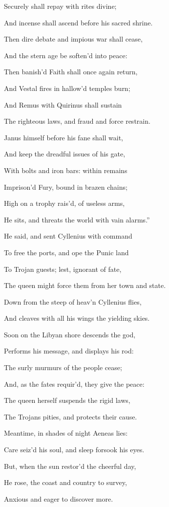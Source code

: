 Securely shall repay with rites divine;

And incense shall ascend before his sacred shrine.

Then dire debate and impious war shall cease,

And the stern age be soften’d into peace:

Then banish’d Faith shall once again return,

And Vestal fires in hallow’d temples burn;

And Remus with Quirinus shall sustain

The righteous laws, and fraud and force restrain.

Janus himself before his fane shall wait,

And keep the dreadful issues of his gate,

With bolts and iron bars: within remains

Imprison’d Fury, bound in brazen chains;

High on a trophy rais’d, of useless arms,

He sits, and threats the world with vain alarms.”

He said, and sent Cyllenius with command

To free the ports, and ope the Punic land

To Trojan guests; lest, ignorant of fate,

The queen might force them from her town and state.

Down from the steep of heav’n Cyllenius flies,

And cleaves with all his wings the yielding skies.

Soon on the Libyan shore descends the god,

Performs his message, and displays his rod:

The surly murmurs of the people cease;

And, as the fates requir’d, they give the peace:

The queen herself suspends the rigid laws,

The Trojans pities, and protects their cause.

Meantime, in shades of night Aeneas lies:

Care seiz’d his soul, and sleep forsook his eyes.

But, when the sun restor’d the cheerful day,

He rose, the coast and country to survey,

Anxious and eager to discover more.

